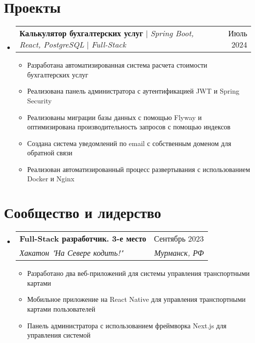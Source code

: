\documentclass[letterpaper,11pt]{article}
\makeatletter
\newcommand{\resumeItem}[1]{
  \item\small{
    {#1 \vspace{-2pt}}
  }
}
\newcommand{\resumeSubheading}[4]{
  \vspace{-2pt}\item
    \begin{tabular*}{0.97\textwidth}[t]{l@{\extracolsep{\fill}}r}
      \textbf{#1} & #2 \\
      \textit{\small#3} & \textit{\small #4} \\
    \end{tabular*}\vspace{-7pt}
}
\newcommand{\resumeProjectHeading}[2]{
    \item
    \begin{tabular*}{0.97\textwidth}{l@{\extracolsep{\fill}}r}
      \small#1 & #2 \\
    \end{tabular*}\vspace{-7pt}
}
\newcommand{\resumeSubHeadingListStart}{\begin{itemize}[leftmargin=0.15in, label={}]}
\newcommand{\resumeSubHeadingListEnd}{\end{itemize}}
\newcommand{\resumeItemListStart}{\begin{itemize}}
\newcommand{\resumeItemListEnd}{\end{itemize}\vspace{-5pt}}
\makeatother
\begin{document}
\section{Проекты}

\resumeSubHeadingListStart

  \resumeProjectHeading
      {\textbf{Калькулятор бухгалтерских услуг} $|$ \emph{Spring Boot, React, PostgreSQL} $|$ \emph{Full-Stack}}{Июль 2024}
      \resumeItemListStart
        \resumeItem{Разработана автоматизированная система расчета стоимости бухгалтерских услуг}
        \resumeItem{Реализована панель администратора с аутентификацией JWT и Spring Security}
        \resumeItem{Реализованы миграции базы данных с помощью Flyway и оптимизирована производительность запросов с помощью индексов}
        \resumeItem{Создана система уведомлений по email с собственным доменом для обратной связи}
        \resumeItem{Реализован автоматизированный процесс развертывания с использованием Docker и Nginx}

    \resumeItemListEnd

\resumeSubHeadingListEnd

\section{Сообщество и лидерство}
  \resumeSubHeadingListStart
    \resumeSubheading
      {Full-Stack разработчик. 3-е место}{Сентябрь 2023}
      {Хакатон "На Севере кодить!"}{Мурманск, РФ}
      \resumeItemListStart
        \resumeItem{Разработано два веб-приложений для системы управления транспортными картами}
        \resumeItem{Мобильное приложение на React Native для управления транспортными картами пользователей}
        \resumeItem{Панель администратора с использованием фреймворка Next.js для управления системой}
      \resumeItemListEnd
    \resumeSubHeadingListEnd
\end{document}

